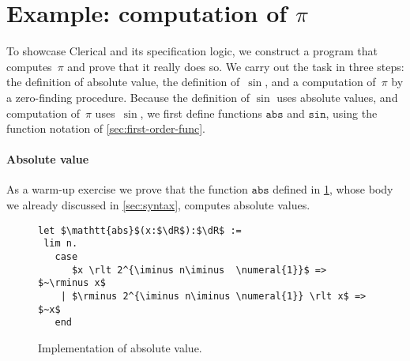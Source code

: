 \section{Example: computation of \texorpdfstring{$\pi$}{π}}
\label{sec:example}

To showcase Clerical and its specification logic, we construct a program that computes~$\pi$ and prove that it really does so.
%
We carry out the task in three steps: the definition of absolute value, the definition of~$\sin$, and a computation of~$\pi$ by a zero-finding procedure. Because the definition of $\sin$ uses absolute values, and computation of~$\pi$  uses~$\sin$, we first define 
functions $\mathtt{abs}$ and $\mathtt{sin}$, using the function notation of \cref{sec:first-order-func}.


\paragraph*{Absolute value}
\label{sec:absolute-value}

As a warm-up exercise we prove that the function $\mathtt{abs}$ defined in \cref{fig:abs-def}, whose body we already discussed in \cref{sec:syntax}, computes absolute values.
%
\begin{figure}[htb]
  \centering
  \begin{mdframed}
  \small
\begin{lstlisting}
let $\mathtt{abs}$(x:$\dR$):$\dR$ :=
 lim n.
   case
      $x \rlt 2^{\iminus n\iminus  \numeral{1}}$ =>  $~\rminus x$ 
    | $\rminus 2^{\iminus n\iminus \numeral{1}} \rlt x$ => $~x$
   end
\end{lstlisting}
  \end{mdframed}
  \caption{Implementation of absolute value.}
  \label{fig:abs-def}
\end{figure}
%

